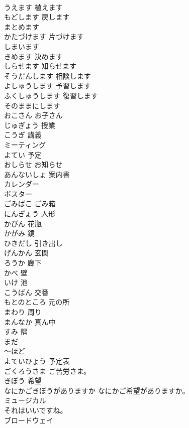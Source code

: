 \documentclass[8pt]{extreport}
\begin{document}
\begin{CJK}{UTF8}{min}
\\	うえます	植えます	
\\	もどします	戻します	
\\	まとめます			
\\	かたづけます	片づけます	
\\	しまいます			
\\	きめます	決めます	
\\	しらせます	知らせます	
\\	そうだんします	相談します	
\\	よしゅうします	予習します	
\\	ふくしゅうします	復習します	
\\	そのままにします			
\\	おこさん	お子さん	
\\	じゅぎょう	授業	
\\	こうぎ	講義	
\\	ミーティング			
\\	よてい	予定	
\\	おしらせ	お知らせ	
\\	あんないしょ	案内書	
\\	カレンダー			
\\	ポスター			
\\	ごみばこ	ごみ箱	
\\	にんぎょう	人形	
\\	かびん	花瓶	
\\	かがみ	鏡	
\\	ひきだし	引き出し	
\\	げんかん	玄関	
\\	ろうか	廊下	
\\	かべ	壁	
\\	いけ	池	
\\	こうばん	交番	
\\	もとのところ	元の所	
\\	まわり	周り	
\\	まんなか	真ん中	
\\	すみ	隅	
\\	まだ			
\\	～ほど			
\\	よていひょう	予定表	
\\	ごくろうさま	ご苦労さま。	
\\	きぼう	希望	
\\	なにかごきぼうがありますか	なにかご希望がありますか。	
\\	ミュージカル			
\\	それはいいですね。			
\\	ブロードウェイ			

\end{CJK}
\end{document}
